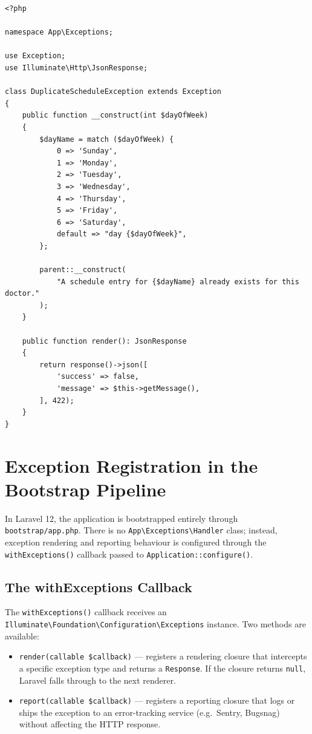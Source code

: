 \begin{lstlisting}[style=php, caption={\texttt{app/Exceptions/DuplicateScheduleException.php}.}]
<?php

namespace App\Exceptions;

use Exception;
use Illuminate\Http\JsonResponse;

class DuplicateScheduleException extends Exception
{
    public function __construct(int $dayOfWeek)
    {
        $dayName = match ($dayOfWeek) {
            0 => 'Sunday',
            1 => 'Monday',
            2 => 'Tuesday',
            3 => 'Wednesday',
            4 => 'Thursday',
            5 => 'Friday',
            6 => 'Saturday',
            default => "day {$dayOfWeek}",
        };

        parent::__construct(
            "A schedule entry for {$dayName} already exists for this doctor."
        );
    }

    public function render(): JsonResponse
    {
        return response()->json([
            'success' => false,
            'message' => $this->getMessage(),
        ], 422);
    }
}
\end{lstlisting}

\section{Exception Registration in the Bootstrap Pipeline}
\label{sec:exception-bootstrap}

In Laravel 12, the application is bootstrapped entirely through
\texttt{bootstrap/app.php}. There is no \texttt{App\textbackslash{}Exceptions\textbackslash{}Handler}
class; instead, exception rendering and reporting behaviour is
configured through the \texttt{withExceptions()} callback passed to
\texttt{Application::configure()}.

\subsection{The withExceptions Callback}

The \texttt{withExceptions()} callback receives an
\texttt{Illuminate\textbackslash{}Foundation\textbackslash{}Configuration\textbackslash{}Exceptions}
instance. Two methods are available:

\begin{itemize}
  \item \texttt{render(callable \$callback)} --- registers a rendering
    closure that intercepts a specific exception type and returns a
    \texttt{Response}. If the closure returns \texttt{null}, Laravel
    falls through to the next renderer.
  \item \texttt{report(callable \$callback)} --- registers a reporting
    closure that logs or ships the exception to an error-tracking
    service (e.g.\ Sentry, Bugsnag) without affecting the HTTP response.
\end{itemize}

